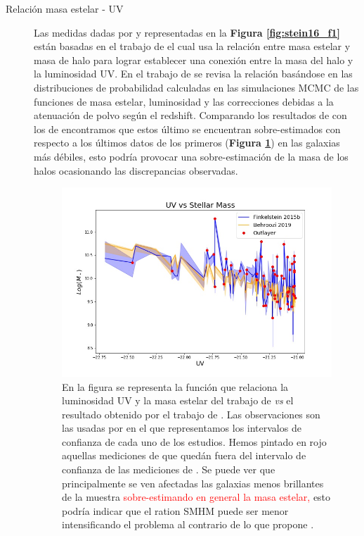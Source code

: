 \begin{description}
	\item[Relación masa estelar - UV] Las medidas dadas por \cite{bouwens2015reionization} y \cite{bouwens2015uv} representadas en la \textbf{Figura \ref{fig:stein16_f1}} están basadas en el trabajo de \cite{finkelstein2015increasing} el cual usa la relación entre masa estelar y masa de halo para lograr establecer una conexión entre la masa del halo y la luminosidad UV. En el trabajo de \cite{behroozi2019universemachine} se revisa la relación basándose en las distribuciones de probabilidad calculadas en las simulaciones MCMC de las funciones de masa estelar, luminosidad y las correcciones debidas a la atenuación de polvo según el redshift. Comparando los resultados de \cite{behroozi2019universemachine} con los de \cite{finkelstein2015increasing} encontramos que estos último se encuentran sobre-estimados con respecto a los últimos datos de los primeros (\textbf{Figura \ref{fig:cstm_behroozi_uvsm}}) en las galaxias más débiles, esto podría provocar una sobre-estimación de la masa de los halos ocasionando las discrepancias observadas.
	\begin{figure}[h]
		\begin{center}
			\includegraphics[scale=0.5]{Figures/behroozi_finkelstein_uvsm.jpg}
			\caption{\label{fig:cstm_behroozi_uvsm} En la figura se representa la función que relaciona la luminosidad UV y la masa estelar del trabajo de \cite{finkelstein2015increasing} \textit{vs} el resultado obtenido por el trabajo de \cite{behroozi2019universemachine}. Las observaciones son las usadas por \cite{finkelstein2015increasing} en el que representamos los intervalos de confianza de cada uno de los estudios. Hemos pintado en rojo aquellas mediciones de \cite{finkelstein2015increasing} que quedán fuera del intervalo de confianza de las mediciones de \cite{behroozi2019universemachine}. Se puede ver que principalmente se ven afectadas las galaxias menos brillantes de la muestra \textcolor{red}{sobre-estimando en general la masa estelar,} esto podría indicar que el ration SMHM puede ser menor intensificando el problema al contrario de lo que propone \cite{behroozi2019universemachine}.}
		\end{center}
	\end{figure}
	

\end{description}
